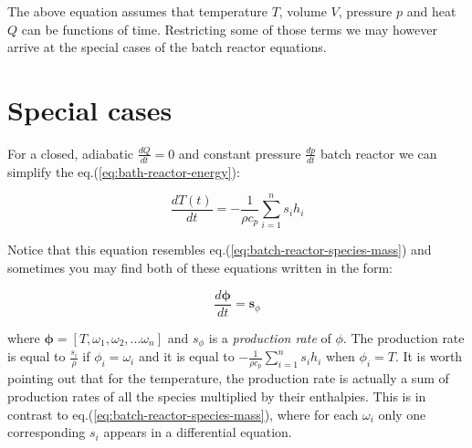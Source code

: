 \documentclass[10pt]{article}
\begin{document}
The above equation assumes that temperature $T$, volume $V$, pressure $p$ and heat $Q$ can be functions of time. Restricting some of those terms we may however arrive at the special cases of the batch reactor equations.

\section{Special cases}

For a closed, adiabatic $\frac{dQ}{dt} = 0$ and constant pressure $\frac{dp}{dt}$ batch reactor we can simplify the eq.(\ref{eq:bath-reactor-energy}):

\begin{equation} \label{eq:bath-reactor-adiabatic-constant-pressure}
 \frac{d T(t)}{dt}  = - \frac{1}{\rho c_{p}} \sum_{i=1}^n  s_i  h_i 
\end{equation}

Notice that this equation resembles eq.(\ref{eq:batch-reactor-species-mass}) and sometimes you may find both of these equations written in the form:

\begin{equation} \label{eq:bath-reactor-adiabatic-constant-pressure}
 \frac{d \boldsymbol{\phi}}{dt}  = \mathbf{s}_{\phi}
\end{equation}

where $ \boldsymbol{\phi} = [T, \omega_1, \omega_2, \dots \omega_n]$ and $s_{\phi}$ is a \textit{production rate} of $\phi$. The production rate is equal to $\frac{s_i}{\rho}$ if $\phi_i = \omega_i$ and it is equal to $ - \frac{1}{\rho c_{p}} \sum_{i=1}^n  s_i  h_i $ when $\phi_i = T$. It is worth pointing out that for the temperature, the production rate is actually a sum of production rates of all the species multiplied by their enthalpies. This is in contrast to eq.(\ref{eq:batch-reactor-species-mass}), where for each $\omega_i$ only one corresponding $s_i$ appears in a differential equation.
\end{document}

